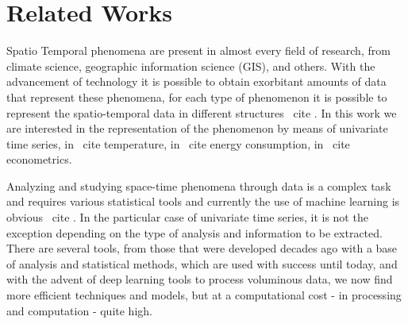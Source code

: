 \chapter{Related Works}
\label{chapter_Related_Works}

Spatio Temporal phenomena are present in almost every field of research, from climate science, geographic information science (GIS), and others. With the advancement of technology it is possible to obtain exorbitant amounts of data that represent these phenomena, for each type of phenomenon it is possible to represent the spatio-temporal data in different structures \ cite {}. In this work we are interested in the representation of the phenomenon by means of univariate time series, in \ cite {} temperature, in \ cite {} energy consumption, in \ cite {} econometrics.

Analyzing and studying space-time phenomena through data is a complex task and requires various statistical tools and currently the use of machine learning is obvious \ cite {}. In the particular case of univariate time series, it is not the exception depending on the type of analysis and information to be extracted. There are several tools, from those that were developed decades ago with a base of analysis and statistical methods, which are used with success until today, and with the advent of deep learning tools to process voluminous data, we now find more efficient techniques and models, but at a computational cost - in processing and computation - quite high.

